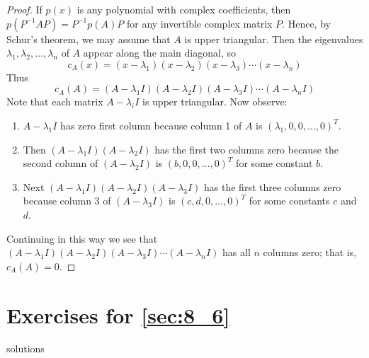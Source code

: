 \begin{proof}
If $p(x)$ is any polynomial with complex coefficients, then $p(P^{-1}AP) = P^{-1}p(A)P$ for any invertible complex matrix $P$. Hence, by Schur's theorem, we may assume that $A$ is upper triangular. Then the eigenvalues $\lambda_{1}, \lambda_{2}, \dots, \lambda_{n}$ of $A$ appear along the main diagonal, so 
\begin{equation*}
c_{A}(x) = (x - \lambda_{1})(x - \lambda_{2})(x - \lambda_{3}) \cdots (x -\lambda_{n})
\end{equation*}
Thus
\begin{equation*}
c_{A}(A) = (A - \lambda_{1}I)(A - \lambda_{2}I)(A - \lambda_{3}I) \cdots (A - \lambda_{n}I)
\end{equation*}
Note that each matrix $A - \lambda_{i}I$ is upper triangular. Now observe:
\begin{enumerate}
\item $A - \lambda_{1}I$ has zero first column because column 1 of $A$ is $(\lambda_{1}, 0, 0, \dots, 0)^{T}$.
\item Then $(A - \lambda_{1}I)(A - \lambda_{2}I)$ has the first two columns zero because the second column of $(A - \lambda_{2}I)$ is $(b, 0, 0, \dots, 0)^{T}$ for some constant $b$.
\item Next $(A - \lambda_{1}I)(A - \lambda_{2}I)(A - \lambda_{3}I)$ has the first three columns zero because column 3 of $(A -\lambda_{3}I)$ is $(c, d, 0, \dots, 0)^{T}$ for some constants $c$ and $d$.
\end{enumerate}
Continuing in this way we see that $(A - \lambda_{1}I)(A - \lambda_{2}I)(A - \lambda_{3}I) \cdots (A - \lambda_{n}I)$ has all $n$ columns zero; that is, $c_{A}(A) = 0$.
\end{proof}

\section*{Exercises for \ref{sec:8_6}}

\begin{Filesave}{solutions}
\end{Filesave}

